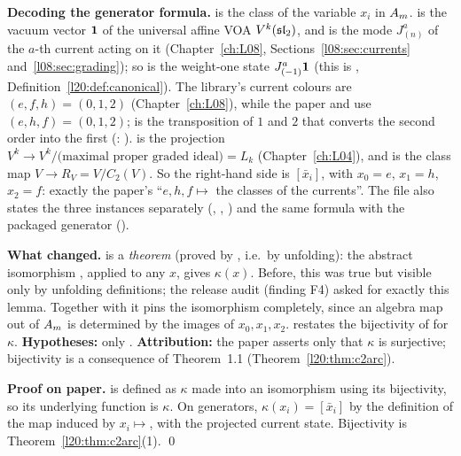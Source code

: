 \begin{dictionary}
\textbf{Decoding the generator formula.}  is the class of the
variable $x_i$ in $A_m$.  is the vacuum vector $\mathbf{1}$ of the universal affine VOA
$V^k(\mathfrak{sl}_2)$, and  is the mode $J^a_{(n)}$ of the $a$-th current acting on it
(Chapter~\ref{ch:L08}, Sections~\ref{l08:sec:currents} and~\ref{l08:sec:grading}); so
 is the weight-one state $J^a_{(-1)}\mathbf{1}$ (this is
, Definition~\ref{l20:def:canonical}). The library's current colours are $(e,f,h)=(0,1,2)$
(Chapter~\ref{ch:L08}), while the paper and  use $(e,h,f)=(0,1,2)$;  is the
transposition of $1$ and $2$ that converts the second order into the first (:
).  is the projection $V^k\to V^k/\text{(maximal proper graded
ideal)}=L_k$ (Chapter~\ref{ch:L04}), and  is the class map $V\to R_V=V/C_2(V)$. So the right-hand
side is $[\bar x_i]$, with $x_0=e$, $x_1=h$, $x_2=f$: exactly the paper's ``$e,h,f\mapsto$ the classes of the currents''.
The file also states the three instances separately (, ,
) and the same formula with the packaged generator ().

\textbf{What changed.}  is a \emph{theorem} (proved by , i.e.\ by unfolding): the
abstract isomorphism , applied to any $x$, gives $\kappa(x)$. Before, this was true but visible only by
unfolding definitions; the release audit (finding F4) asked for exactly this lemma. Together with  it
pins the isomorphism completely, since an algebra map out of $A_m$ is determined by the images of $x_0,x_1,x_2$.
 restates the bijectivity of  for $\kappa$. \textbf{Hypotheses:} only
. \textbf{Attribution:} the paper asserts only that $\kappa$ is surjective; bijectivity is a consequence of
Theorem~1.1 (Theorem~\ref{l20:thm:c2arc}).
\end{dictionary}

\textbf{Proof on paper.}  is defined as $\kappa$ made into an isomorphism using its bijectivity, so its
underlying function is $\kappa$. On generators, $\kappa(x_i)=[\bar x_i]$ by the definition of the map induced by
$x_i\mapsto$, with  the projected current state. Bijectivity is
Theorem~\ref{l20:thm:c2arc}(1). \qed

